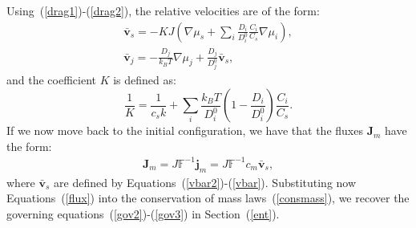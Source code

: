 \documentclass[runningheads]{llncs}
\newcommand{\F}{\ensuremath{\mathbb{F}}}
\begin{document}
Using~(\ref{drag1})-(\ref{drag2}), the relative velocities are of the form:
\begin{eqnarray}
\bar{\mathbf{v}}_s = -K J \left(\nabla \mu_s +\sum_i \frac{D_i}{D^0_i} \frac{C_i}{C_s} \nabla \mu_i\right),\label{vbar2}\\
\bar{\mathbf{v}}_j = - \frac{D_j}{k_B T}\nabla \mu_j + \frac{D_j}{D^0_j} \bar{\mathbf{v}}_s, \label{vbar}
\end{eqnarray}
and the coefficient $K$ is defined as:
\begin{equation}
\frac{1}{K} = \frac{1}{c_sk} + \sum_i \frac{k_B T}{D^0_i} \left(1-\frac{D_i}{D^0_i}\right) \frac{C_i}{C_s}.
\end{equation}
If we now move back to the initial configuration, we have that the fluxes $\mathbf{J}_m$ have the form:
\begin{eqnarray}
\mathbf{J}_m = J \F^{-1} \mathbf{j}_m= J \F^{-1} c_m \bar{\mathbf{v}}_s,\label{flux}
\end{eqnarray}
where $\bar{\mathbf{v}}_s$ are defined by Equations~(\ref{vbar2})-(\ref{vbar}). Substituting now Equations~(\ref{flux}) into the conservation of mass laws~(\ref{consmass}), we recover the governing equations~(\ref{gov2})-(\ref{gov3}) in Section~(\ref{ent}).


%
\newpage


%
\end{document}
